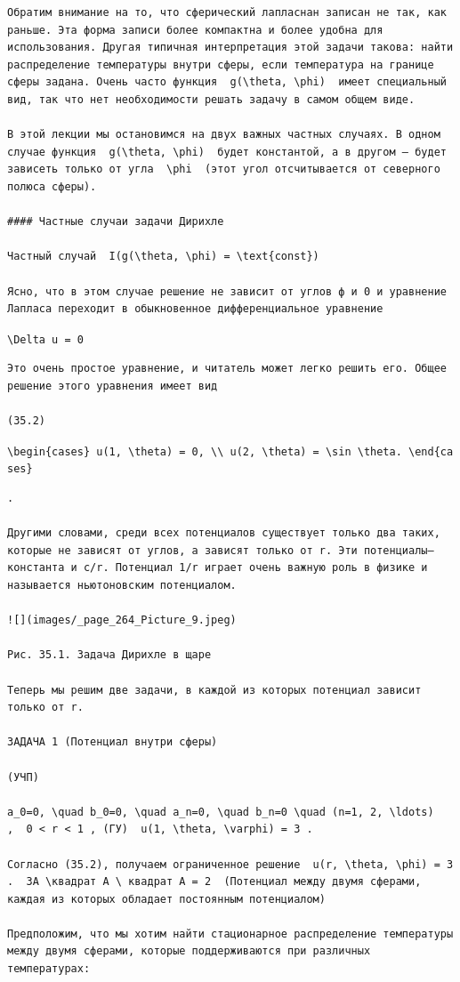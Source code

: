 \documentclass[
  ukrainian,
]{article}
\begin{document}
\begin{verbatim}
Обратим внимание на то, что сферический лапласнан записан не так, как раньше. Эта форма записи более компактна и более удобна для использования. Другая типичная интерпретация этой задачи такова: найти распределение температуры внутри сферы, если температура на границе сферы задана. Очень часто функция  g(\theta, \phi)  имеет специальный вид, так что нет необходимости решать задачу в самом общем виде.

В этой лекции мы остановимся на двух важных частных случаях. В одном случае функция  g(\theta, \phi)  будет константой, а в другом — будет зависеть только от угла  \phi  (этот угол отсчитывается от северного полюса сферы).

#### Частные случаи задачи Дирихле

Частный случай  I(g(\theta, \phi) = \text{const}) 

Ясно, что в этом случае решение не зависит от углов ф и 0 и уравнение Лапласа переходит в обыкновенное дифференциальное уравнение
\end{verbatim}

\texttt{\textbackslash{}Delta\ u\ =\ 0}

\begin{verbatim}
Это очень простое уравнение, и читатель может легко решить его. Общее решение этого уравнения имеет вид

(35.2)
\end{verbatim}

\texttt{\textbackslash{}begin\{cases\}\ u(1,\ \textbackslash{}theta)\ =\ 0,\ \textbackslash{}\textbackslash{}\ u(2,\ \textbackslash{}theta)\ =\ \textbackslash{}sin\ \textbackslash{}theta.\ \textbackslash{}end\{cases\}}

\begin{verbatim}
.

Другими словами, среди всех потенциалов существует только два таких, которые не зависят от углов, а зависят только от r. Эти потенциалы— константа и c/r. Потенциал 1/r играет очень важную роль в физике и называется ньютоновским потенциалом.

![](images/_page_264_Picture_9.jpeg)

Рис. 35.1. Задача Дирихле в щаре

Теперь мы решим две задачи, в каждой из которых потенциал зависит только от r.

ЗАДАЧА 1 (Потенциал внутри сферы)

(УЧП) 

a_0=0, \quad b_0=0, \quad a_n=0, \quad b_n=0 \quad (n=1, 2, \ldots)
,  0 < r < 1 , (ГУ)  u(1, \theta, \varphi) = 3 .

Согласно (35.2), получаем ограниченное решение  u(r, \theta, \phi) = 3 .  3A \квадрат A \ квадрат A = 2  (Потенциал между двумя сферами, каждая из которых обладает постоянным потенциалом)

Предположим, что мы хотим найти стационарное распределение температуры между двумя сферами, которые поддерживаются при различных температурах:
\end{verbatim}
\end{document}
